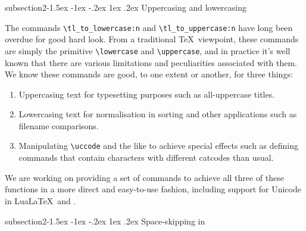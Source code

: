 \documentclass{ltnews}
\makeatletter
\providecommand\LuaLaTeX{Lua\LaTeX}
\newcommand{\@subheadingfont}{%
   \sffamily\slshape
   \let\LaTeX\cmssLaTeX\let\TeX\cmssTeX
}
\renewcommand{\subsection}{%
   \@startsection
      {subsection}{2}{\z@}{-1.5ex \@plus -1ex \@minus -.2ex}%
      {1ex \@plus.2ex}{\@subheadingfont}%
}
\providecommand\LuaLaTeX{Lua\LaTeX}
\makeatother
\begin{document}
\subsection{Uppercasing and lowercasing}

The commands \verb"\tl_to_lowercase:n" and \verb"\tl_to_uppercase:n" have long been overdue for good hard look.
From a traditional \TeX\ viewpoint, these commands are simply the primitive \verb"\lowercase" and \verb"\uppercase", and in practice it's well known that there are various limitations and peculiarities associated with them.
We know these commands are good, to one extent or another, for three things:
\begin{enumerate}
\item
Uppercasing text for typesetting purposes such as all-uppercase titles.
\item
Lowercasing text for normalisation in sorting and other applications such as filename comparisons.
\item
Manipulating \verb"\uccode" and the like to achieve special effects such as defining commands that contain characters with different catcodes than usual.
\end{enumerate}
We are working on providing a set of commands to achieve all three of these functions in a more direct and easy-to-use fashion, including support for Unicode in \LuaLaTeX\ and \XeLaTeX.

\subsection{Space-skipping in }
\end{document}
